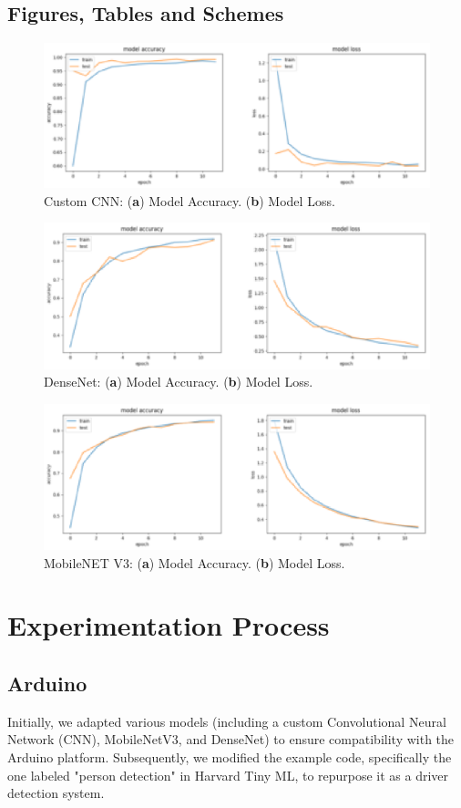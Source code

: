 \documentclass[journal,article,submit,pdftex,moreauthors]{Definitions/mdpi}
\begin{document}
\subsection{Figures, Tables and Schemes}
\begin{figure}[H]
\includegraphics[width=10.5 cm]{customCNN}
\caption{Custom CNN: (\textbf{a}) Model Accuracy. (\textbf{b}) Model Loss.\label{fig1}}
\end{figure}  
\begin{figure}[H]
\includegraphics[width=10.5 cm]{DenseNet}
\caption{DenseNet: (\textbf{a}) Model Accuracy. (\textbf{b}) Model Loss.\label{fig2}}
\end{figure}  
\begin{figure}[H]
\includegraphics[width=10.5 cm]{mobileNET_V3}
\caption{MobileNET V3: (\textbf{a}) Model Accuracy. (\textbf{b}) Model Loss.\label{fig3}}
\end{figure}
\section{Experimentation Process}

\subsection{Arduino}
Initially, we adapted various models (including a custom Convolutional Neural Network (CNN), MobileNetV3, and DenseNet) to ensure compatibility with the Arduino platform. Subsequently, we modified the example code, specifically the one labeled "person detection" in Harvard Tiny ML, to repurpose it as a driver detection system.
\end{document}
